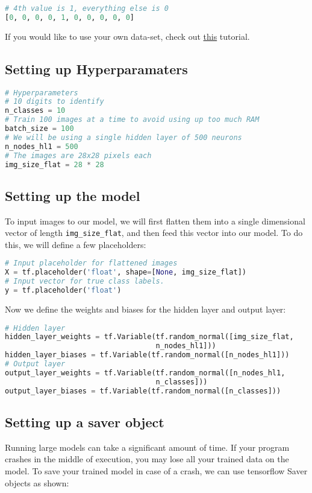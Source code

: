 \documentclass[Proceedings]{ascelike}
\begin{document}
\begin{lstlisting}[language=Python]
# 4th value is 1, everything else is 0
[0, 0, 0, 0, 1, 0, 0, 0, 0, 0]
\end{lstlisting}

If you would like to use your own data-set, check out \href{https://agray3.github.io/2016/11/29/Demystifying-Data-Input-to-TensorFlow-for-Deep-Learning.html}{this} tutorial.

\subsection{Setting up Hyperparamaters}
\begin{lstlisting}[language=Python]
# Hyperparameters
# 10 digits to identify
n_classes = 10
# Train 100 images at a time to avoid using up too much RAM
batch_size = 100
# We will be using a single hidden layer of 500 neurons
n_nodes_hl1 = 500
# The images are 28x28 pixels each
img_size_flat = 28 * 28
\end{lstlisting}

\subsection{Setting up the model}
To input images to our model, we will first flatten them into a single dimensional vector of length \texttt{img\_size\_flat}, and then feed this vector into our model. To do this, we will define a few placeholders:

\begin{lstlisting}[language=Python]
# Input placeholder for flattened images
X = tf.placeholder('float', shape=[None, img_size_flat])
# Input vector for true class labels.
y = tf.placeholder('float')
\end{lstlisting}

Now we define the weights and biases for the hidden layer and output layer:

\begin{lstlisting}[language=Python]
# Hidden layer
hidden_layer_weights = tf.Variable(tf.random_normal([img_size_flat, 
                                   n_nodes_hl1]))
hidden_layer_biases = tf.Variable(tf.random_normal([n_nodes_hl1]))
# Output layer
output_layer_weights = tf.Variable(tf.random_normal([n_nodes_hl1,
                                   n_classes]))
output_layer_biases = tf.Variable(tf.random_normal([n_classes]))
\end{lstlisting}

\subsection{Setting up a saver object}
Running large models can take a significant amount of time. If your program crashes in the middle of execution, you may lose all your trained data on the model. To save your trained model in case of a crash, we can use tensorflow Saver objects as shown:
\end{document}
